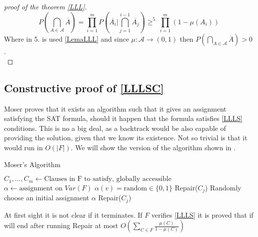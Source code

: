 \begin{proof}[proof of the theorem \ref{LLL}]
\[
P\left ( \bigcap_{A\in \mathcal{A}} \overline{A}\right ) = \prod_{i=1}^m P \left( \overline{A_i} \Big | \bigcap_{j=1}^{i-1} \overline{A_j}\right) \ge^{5.} \prod_{i=1}^m ( 1 - \mu(A_i))
\]
	Where in 5. is used \ref{LemaLLL} and since $\mu:\mathcal{A}\to (0,1)$ then $P\left ( \bigcap_{A\in \mathcal{A}} \overline{A}\right )  > 0$.\\
\end{proof}


\subsection{Constructive proof of \ref{LLLSC}}

Moser\cite{moser2013exact} proves that it exists an algorithm such that it gives an assignment satisfying the SAT formula, should it happen that the formula satisfies \ref{LLLS} conditions. This is no a big deal, as a backtrack would be also capable of providing the solution, given that we know its existence. Not so trivial is that it would run in $O(|F|)$. We will show the version of the algorithm shown in \cite{schoning2013satisfiability}.



\begin{algorithm}
\caption{Moser's Algorithm}\label{euclid}
\begin{algorithmic}[1]
  \State $C_1,...,C_m \gets \text{Clauses in F to satisfy, globally accessible}$
  \State $\alpha \gets \text{assignment on }Var(F)$
  \State
  \State $\alpha(v) = \text{random} \in \{0,1\}$
  \EndFor
  \State Repair($C_j$)
  \EndIf
  \EndFor
  \EndProcedure
  \State
  \State Randomly choose an initial assignment $\alpha$
  \State Repair($C_j$)

\end{algorithmic}
\end{algorithm}


At first sight it is not clear if it terminates. If $F$ verifies \ref{LLLS} it is proved that if will end after running Repair at most  $O(\sum_{C\in F} \frac{\mu(C)}{1-\mu(C)})$


